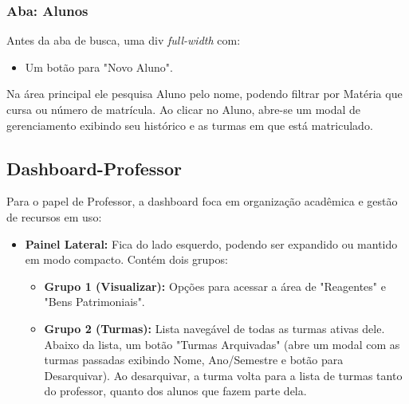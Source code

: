 \documentclass[12pt,a4paper]{article}
\begin{document}
\subsubsection{Aba: Alunos}
Antes da aba de busca, uma div \textit{full-width} com:
\begin{itemize}
    \item Um botão para "Novo Aluno".
\end{itemize} 
Na área principal ele pesquisa Aluno pelo nome, podendo filtrar por Matéria que cursa ou número de matrícula. Ao clicar no Aluno, abre-se um modal de gerenciamento exibindo seu histórico e as turmas em que está matriculado.

\subsection{Dashboard-Professor}
Para o papel de Professor, a dashboard foca em organização acadêmica e gestão de recursos em uso:
\begin{itemize}
    \item \textbf{Painel Lateral:} Fica do lado esquerdo, podendo ser expandido ou mantido em modo compacto. Contém dois grupos:
    \begin{itemize}
        \item \textbf{Grupo 1 (Visualizar):} Opções para acessar a área de "Reagentes" e "Bens Patrimoniais".
        \item \textbf{Grupo 2 (Turmas):} Lista navegável de todas as turmas ativas dele. Abaixo da lista, um botão "Turmas Arquivadas" (abre um modal com as turmas passadas exibindo Nome, Ano/Semestre e botão para Desarquivar). Ao desarquivar, a turma volta para a lista de turmas tanto do professor, quanto dos alunos que fazem parte dela.
    \end{itemize}
\end{itemize}
\end{document}
